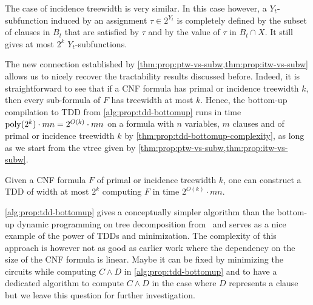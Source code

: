 \documentclass[a4paper,UKenglish,cleveref, autoref, thm-restate]{lipics-v2021}
\begin{document}
The case of incidence treewidth is very similar.  In this case however, a $Y_t$-subfunction induced by an assignment $\tau \in 2^{Y_t}$ is completely defined by the subset of clauses in $B_t$ that are satisfied by $\tau$ and by the value of $\tau$ in $B_t \cap X$. It still gives at most $2^k$ $Y_t$-subfunctions. 

The new connection established by \cref{thm:prop:ptw-vs-subw,thm:prop:itw-vs-subw} allows us to nicely recover the tractability results discussed before. Indeed, it is straightforward to see that if a CNF formula has primal or incidence treewidth $k$, then every sub-formula of $F$ has treewidth at most $k$. Hence, the bottom-up compilation to TDD from \cref{alg:prop:tdd-bottomup} runs in time $\operatorname{poly}(2^k) \cdot mn = 2^{O(k)} \cdot mn$ on a formula with $n$ variables, $m$ clauses and of primal or incidence treewidth $k$ by \cref{thm:prop:tdd-bottomup-complexity}, as long as we start from the vtree given by \cref{thm:prop:ptw-vs-subw,thm:prop:itw-vs-subw}.


\begin{theorem}
  \label{thm:prop:dtdd-tw}
Given a CNF formula $F$ of primal or incidence treewidth $k$, one can construct a TDD of width at most $2^k$ computing $F$ in time $2^{O(k)} \cdot mn$. 
\end{theorem}

\cref{alg:prop:tdd-bottomup} gives a conceptually simpler algorithm than the bottom-up dynamic programming on tree decomposition from~\cite{SamerS10} and serves as a nice example of the power of TDDs and minimization. %
%
The complexity of this approach is however not as good as earlier work where the dependency on the size of the CNF formula is linear. Maybe it can be fixed by minimizing the circuits while computing $C \wedge D$ in \cref{alg:prop:tdd-bottomup} and to have a dedicated algorithm to compute $C \wedge D$ in the case where $D$ represents a clause but we leave this question for further investigation.

\end{document}
